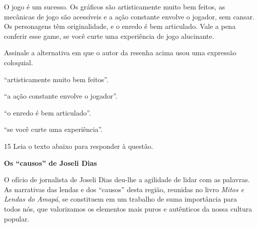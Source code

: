 \begin{myquote}




O jogo é um sucesso. Os gráficos são artisticamente muito bem feitos, as
mecânicas de jogo são acessíveis e a ação constante envolve o jogador, sem
cansar. Os personagens têm originalidade, e o enredo é bem articulado. Vale 
a pena conferir esse game, se você curte uma experiência de jogo alucinante.


\end{myquote}

Assinale a alternativa em que o autor da resenha acima usou uma expressão 
coloquial.

\begin{escolha}
  
  \item ``artisticamente muito bem feitos''.
  
  \item ``a ação constante envolve o jogador''.
  
  \item ``o enredo é bem articulado''.
  
  \item ``se você curte uma experiência''.

\end{escolha}

\num{15} Leia o texto abaixo para responder à questão. 

\begin{myquote}

\textbf{Os ``causos'' de Joseli Dias}

O ofício de jornalista de Joseli Dias deu-lhe a agilidade de lidar com as
palavras. As narrativas das lendas e dos ``causos'' desta região, reunidas no
livro \textit{Mitos e Lendas do Amapá}, se constituem em um trabalho de suma
importância para todos nós, que valorizamos os elementos mais puros e
autênticos da nossa cultura popular.


\end{myquote}

